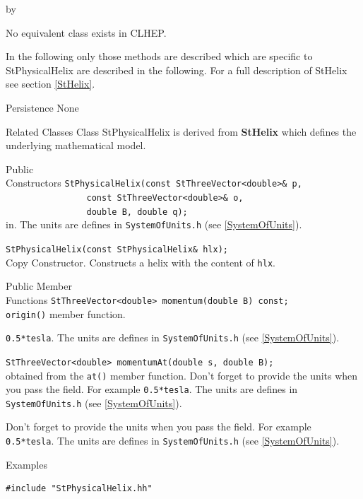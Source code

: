 \documentclass[twoside]{article}
\newcommand{\comp}[1]{\texttt{#1}}%
\newcommand{\entrylabel}[1]{\mbox{\textbf{{#1}}}\hfil}%
\newenvironment{entry}
{\begin{list}{}%
    {\renewcommand{\makelabel}{\entrylabel}%
     \setlength{\labelwidth}{90pt}%
     \setlength{\leftmargin}{\labelwidth}
     \advance\leftmargin by \labelsep%
      }%
    }%
  {\end{list}}
\newcommand{\Entrylabel}[1]%
{\raisebox{0pt}[1ex][0pt]{\makebox[\labelwidth][l]%
    {\parbox[t]{\labelwidth}{\hspace{0pt}\textbf{{#1}}}}}}
\newenvironment{Entry}%
{\renewcommand{\entrylabel}{\Entrylabel}\begin{entry}}%
  {\end{entry}}
\begin{document}
\begin{description}
\begin{Entry}
    No equivalent class exists in CLHEP.

    In the following only those methods are described which are specific
    to StPhysicalHelix are described in the following. For a full description of
    StHelix see section \ref{StHelix}.
    
\item[Persistence]
    None

\item[Related Classes]
    Class StPhysicalHelix is derived from {\bf StHelix}
    which defines the underlying mathematical model.
    
\item[Public\\ Constructors]
    \verb+StPhysicalHelix(const StThreeVector<double>& p, + \\
    \verb+                const StThreeVector<double>& o, + \\
    \verb+                double B, double q);+ \\
    in. The units are defines in \texttt{SystemOfUnits.h}
    (see \ref{SystemOfUnits}).
    
    \verb+StPhysicalHelix(const StPhysicalHelix& hlx);+\\
    Copy Constructor. Constructs a helix with the content of \comp{hlx}.
            
\item[Public Member\\ Functions]
    \verb+StThreeVector<double> momentum(double B) const;+\\
    \comp{origin()} member function.
    
    \texttt{0.5*tesla}. The units are defines in \texttt{SystemOfUnits.h}
    (see \ref{SystemOfUnits}).

    \verb+StThreeVector<double> momentumAt(double s, double B);+\\
    obtained from the \comp{at()} member function.
    Don't forget to provide the units when you pass the field. For example
    \texttt{0.5*tesla}. The units are defines in \texttt{SystemOfUnits.h}
    (see \ref{SystemOfUnits}).
    
    Don't forget to provide the units when you pass the field. For example
    \texttt{0.5*tesla}. The units are defines in \texttt{SystemOfUnits.h}
    (see \ref{SystemOfUnits}).
    
\item[Examples]
{\footnotesize
\begin{verbatim}
#include "StPhysicalHelix.hh"


\end{verbatim}}
\end{Entry}
\end{description}
\end{document}
